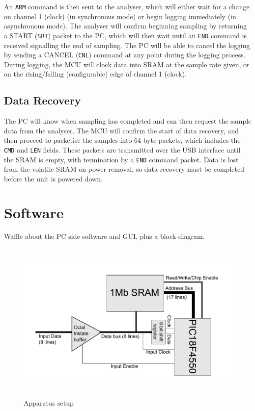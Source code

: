 \documentclass[11pt]{article}
\begin{document}
    An \texttt{ARM} command is then sent to the analyser, which will either wait
    for a change on channel 1 (clock) (in synchronous mode) or begin logging
    immediately (in asynchronous mode). The analyser will confirm beginning
    sampling by returning a START (\texttt{SRT}) packet to the PC, which 
    will then
    wait until an \texttt{END} command is received signalling the end of
    sampling. The PC will be able to cancel the logging by sending a CANCEL
    (\texttt{CNL}) command at any point during the logging process. During
    logging, the MCU will clock data into SRAM at the sample rate given, or on
    the rising/falling (configurable) edge of channel 1 (clock).

\subsection{Data Recovery}
    The PC will know when sampling has completed and can then request the sample
    data from the analyser. The MCU will confirm the start of data recovery, and
    then proceed to packetise the samples into 64 byte packets, which includes
    the \texttt{CMD} and \texttt{LEN} fields. These packets are transmitted over
    the USB interface until the SRAM is empty, with termination by a
    \texttt{END} command packet. Data is lost from the volatile SRAM on power
    removal, so data recovery must be completed before the unit is powered down.

\section{Software}
    Waffle about the PC side software and GUI, plus a block diagram.
    
    \begin{figure}
    \centering
    \includegraphics[height=8cm]{block_diagram.pdf}
    \caption{Apparatus setup}
    \label{fig:app}
    \end{figure}
	
\end{document}
